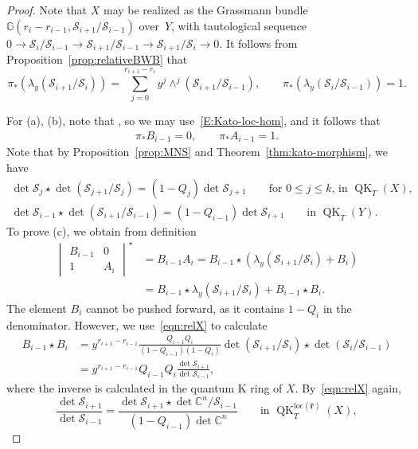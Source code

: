 \documentclass[11pt]{article}
\numberwithin{equation}{section}
\numberwithin{equation}{section}
\theoremstyle{definition}
\DeclareMathOperator{\QK}{QK}
\def\loc{{\mathrm{loc}}}
\newcommand{\C}{{\mathbb C}}
\newcommand{\cS}{{\mathcal S}}
\begin{document}
 \begin{proof}
 Note that $X$ may be realized as the Grassmann bundle $\mathbb{G}(r_i-r_{i-1}, \cS_{i+1}/\cS_{i-1})$
 over~$Y$, with tautological sequence $0 \to \cS_i/\cS_{i-1} \to \cS_{i+1}/\cS_{i-1} \to \cS_{i+1}/\cS_{i} \to 0$.
 It follows from Proposition~\ref{prop:relativeBWB} that
 \begin{equation}\label{eqn:pushforwards-lambda}
 \pi_*(\lambda_y(\cS_{i+1}/\cS_{i}))=\sum_{j=0}^{r_{i+1}-r_i}y^j\wedge^j(\cS_{i+1}/\cS_{i-1}), \qquad\pi_* (\lambda_y(\cS_i/\cS_{i-1})) = 1.
 \end{equation}

 For (a), (b), note that \smash{$A_{i-1}, B_{i-1}\in \QK_T^{\loc(\mathbf{\hat r})}(X)$}, so we may use~\eqref{E:Kato-loc-hom}, and it follows that
 \begin{gather*}%
 \pi_*B_{i-1}=0,\qquad \pi_*A_{i-1} = 1.
 \end{gather*}
 Note that by Proposition~\ref{prop:MNS} and Theorem~\ref{thm:kato-morphism}, we have
 \begin{gather}
 \det\cS_{j}\star\det(\cS_{j+1}/\cS_{j})=(1-Q_{j})\det\cS_{j+1}\qquad \text{for $0\leq j\leq k$, in $\QK_T(X)$},\label{eqn:relX}\\
 \det\cS_{i-1}\star\det(\cS_{i+1}/\cS_{i-1})=(1-Q_{i-1})\det\cS_{i+1}\qquad \text{in $\QK_T(Y)$}.\label{eqn:relY}
\end{gather}
 To prove (c), we obtain from definition
 \begin{align}
 \begin{vmatrix}
 B_{i-1} & 0\\
 1 & A_{i}
 \end{vmatrix}^\star
 &{}= B_{i-1}A_i=B_{i-1} \star (\lambda_y(\cS_{i+1}/\cS_i)+B_i)\nonumber\\
 &{}= B_{i-1}\star \lambda_y(\cS_{i+1}/\cS_i)+ B_{i-1} \star B_i .\qquad\label{eqn:3-expand}
 \end{align}
 The element $B_{i}$ cannot be pushed forward, as it contains $1-Q_i$ in the denominator. However,
 we use~\eqref{eqn:relX} to calculate
 \begin{align*}
 B_{i-1} \star B_i &{}= y^{r_{i+1}-r_{i-1}} \frac{Q_{i-1} Q_i}{(1-Q_{i-1})(1-Q_i)} \det (\cS_{i+1}/\cS_i) \star \det (\cS_{i}/\cS_{i-1}) \\
 &{}= y^{r_{i+1}-r_{i-1}}Q_{i-1}Q_i\frac{\det\cS_{i+1}}{\det\cS_{i-1}} ,
 \end{align*}
 where the inverse is calculated in the quantum K ring of $X$. By~\eqref{eqn:relX} again,
 \[ \frac{\det\cS_{i+1}}{\det\cS_{i-1}} = \frac{\det \cS_{i+1} \star\det \C^n/\cS_{i-1}}{(1-Q_{i-1})\det \C^n}\qquad \text{in $\QK_T^{\loc(\mathbf{\hat r})}(X)$}, \]

\end{proof}
\end{document}
